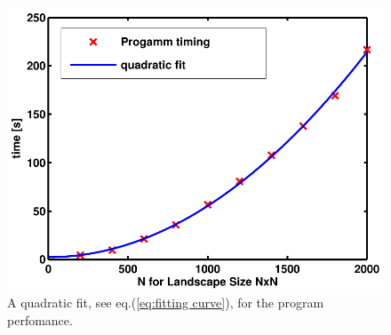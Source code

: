 \begin{figure}
 \includegraphics{Figures/TimingFitO5.pdf}
\caption{A quadratic fit, see eq.(\ref{eq:fitting curve}), for the program perfomance.}
\label{fig:fitting curve}
\end{figure}








